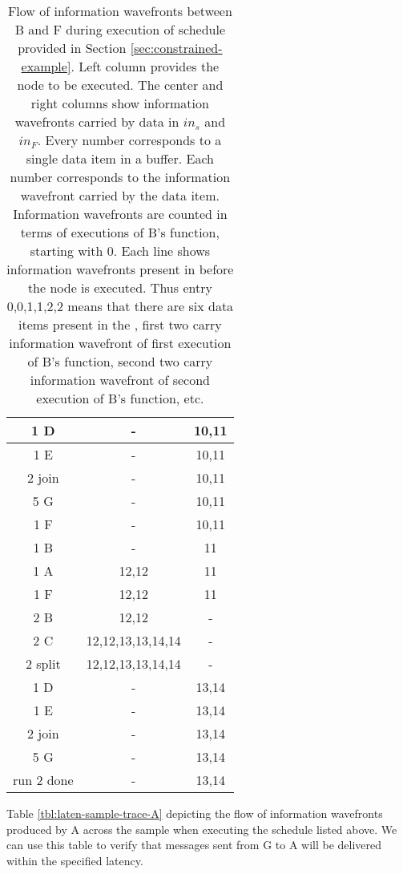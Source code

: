 \begin{table}
\begin{tabular}{|c|c|c|}
\hline 1 D & - & 10,11 \\
\hline 1 E & - & 10,11 \\
\hline 2 join & - & 10,11 \\
\hline 5 G & - & 10,11 \\
\hline 1 F & - & 10,11 \\
\hline 1 B & - & 11 \\
\hline 1 A & 12,12 & 11 \\
\hline 1 F & 12,12 & 11 \\
\hline 2 B & 12,12 & - \\
\hline 2 C & 12,12,13,13,14,14 & - \\
\hline 2 split & 12,12,13,13,14,14 & - \\
\hline 1 D & - & 13,14 \\
\hline 1 E & - & 13,14 \\
\hline 2 join & - & 13,14 \\
\hline 5 G & - & 13,14 \\
\hline run 2 done & - & 13,14 \\
\hline
\end{tabular}
\begin{comment}
\hline
\end{comment}
\caption[Flow of information wavefronts between {\filters} B an dF
in Figure \ref{fig:constrained-example}]{Flow of information
wavefronts between {\filters} B and F during execution of schedule
provided in Section \ref{sec:constrained-example}. Left column
provides the node to be executed.  The center and right columns
show information wavefronts carried by data in {{\Channels}} $in_s$
and $in_F$.  Every number corresponds to a single data item in a
buffer.  Each number corresponds to the information wavefront
carried by the data item. Information wavefronts are counted in
terms of executions of {\filter} B's {\work} function, starting
with 0.  Each line shows information wavefronts present in
{{\Channels}} before the node is executed. Thus entry 0,0,1,1,2,2
means that there are six data items present in the {{\Channel}}, first
two carry information wavefront of first execution of B's {\work}
function, second two carry information wavefront of second
execution of B's {\work} function, etc.}
\label{tbl:laten-sample-trace-B}
\end{table}

Table \ref{tbl:laten-sample-trace-A} depicting the flow of
information wavefronts produced by {\filter} A across the sample
{\pipeline} when executing the schedule listed above.  We can use
this table to verify that messages sent from {\filter} G to {\filter}
A will be delivered within the specified latency.

